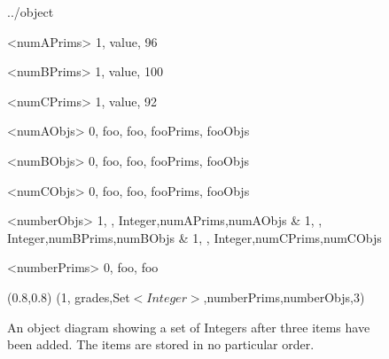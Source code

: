 \documentclass{article}
\begin{document}
\begin {figure}


\Draw

 {../object}

\Indirect \Table <numAPrims>
{  1, value, 96 }

\Indirect \Table <numBPrims>
{  1, value, 100 }

\Indirect \Table <numCPrims>
{  1, value, 92 }

\Indirect \Table <numAObjs>
{  0, foo, foo, fooPrims, fooObjs   }

\Indirect \Table <numBObjs>
{  0, foo, foo, fooPrims, fooObjs   }

\Indirect \Table <numCObjs>
{  0, foo, foo, fooPrims, fooObjs   }

\Indirect \Table <numberObjs>
 {  
    1, , Integer,numAPrims,numAObjs		&
    1, , Integer,numBPrims,numBObjs		&
    1, , Integer,numCPrims,numCObjs
}
  
\Indirect \Table <numberPrims>
 {  0, foo, foo}


\Scale (0.8,0.8)
\ObjSet(1, grades,Set$<Integer>$,numberPrims,numberObjs,3)
    
\EndDraw

\caption {An object diagram showing a set of Integers after three
items have been added. The items are stored in no particular order.} 

\label {fig:set}

\end {figure}
\end{document}
